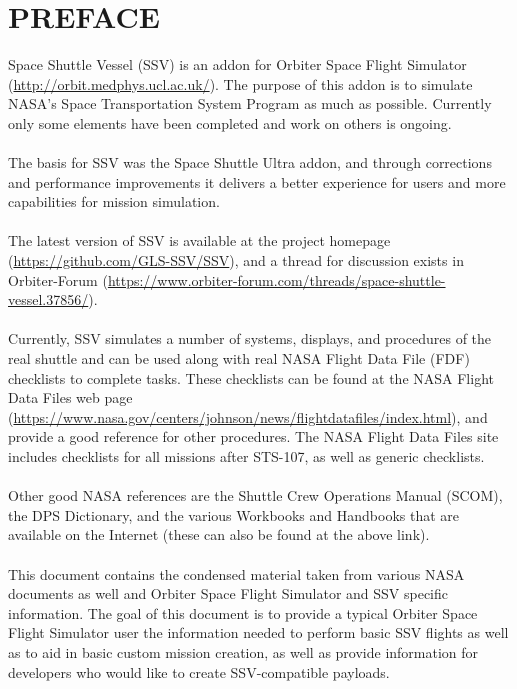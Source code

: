 \documentclass[Space_Shuttle_Vessel_Manual.tex]{subfiles}
\begin{document}
\section*{PREFACE}
\begin{multicols*}{2}
Space Shuttle Vessel (SSV) is an addon for Orbiter Space Flight Simulator (\url{http://orbit.medphys.ucl.ac.uk/}). The purpose of this addon is to simulate NASA's Space Transportation System Program as much as possible. Currently only some elements have been completed and work on others is ongoing.\\
\\
The basis for SSV was the Space Shuttle Ultra addon, and through corrections and performance improvements it delivers a better experience for users and more capabilities for mission simulation.\\
\\
The latest version of SSV is available at the project homepage (\url{https://github.com/GLS-SSV/SSV}), and a thread for discussion exists in Orbiter-Forum (\url{https://www.orbiter-forum.com/threads/space-shuttle-vessel.37856/}).\\
\\
Currently, SSV simulates a number of systems, displays, and procedures of the real shuttle and can be used along with real NASA Flight Data File (FDF) checklists to complete tasks. These checklists can be found at the NASA Flight Data Files web page (\url{https://www.nasa.gov/centers/johnson/news/flightdatafiles/index.html}), and provide a good reference for other procedures. The NASA Flight Data Files site includes checklists for all missions after STS-107, as well as generic checklists.\\
\\
Other good NASA references are the Shuttle Crew Operations Manual (SCOM), the DPS Dictionary, and the various Workbooks and Handbooks that are available on the Internet (these can also be found at the above link).\\
\\
This document contains the condensed material taken from various NASA documents as well and Orbiter Space Flight Simulator and SSV specific information. The goal of this document is to provide a typical Orbiter Space Flight Simulator user the information needed to perform basic SSV flights as well as  to aid in basic custom mission creation, as well as provide information for developers who would like to create SSV-compatible payloads.\\

\end{multicols*}
\end{document}
